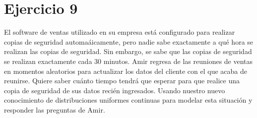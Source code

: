 \documentclass[
  letterpaper,
  DIV=11,
  numbers=noendperiod]{scrreprt}
\begin{document}
\hypertarget{ejercicio-9}{%
\section{Ejercicio 9}\label{ejercicio-9}}

El software de ventas utilizado en su empresa está configurado para
realizar copias de seguridad automaáicamente, pero nadie sabe
exactamente a qué hora se realizan las copias de seguridad. Sin embargo,
se sabe que las copias de seguridad se realizan exactamente cada 30
minutos. Amir regresa de las reuniones de ventas en momentos aleatorios
para actualizar los datos del cliente con el que acaba de reunirse.
Quiere saber cuánto tiempo tendrá que esperar para que realice una copia
de seguridad de sus datos recién ingresados. Usando nuestro nuevo
conocimiento de distribuciones uniformes continuas para modelar esta
situación y responder las preguntas de Amir.
\end{document}

